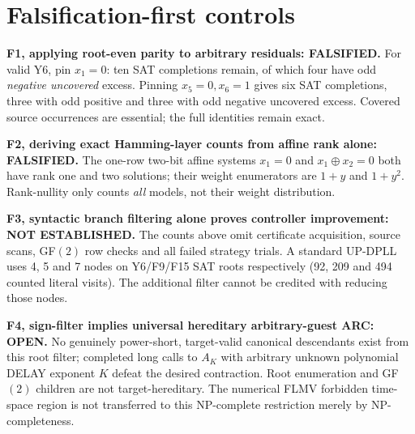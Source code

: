 \documentclass[11pt]{article}
\begin{document}
\section{Falsification-first controls}
\noindent\textbf{F1, applying root-even parity to arbitrary residuals: FALSIFIED.}
For valid Y6, pin $x_1=0$: ten SAT completions remain, of which four have odd \emph{negative uncovered} excess. Pinning $x_5=0,x_6=1$ gives six SAT completions, three with odd positive and three with odd negative uncovered excess. Covered source occurrences are essential; the full identities remain exact.
\par\noindent\textbf{F2, deriving exact Hamming-layer counts from affine rank alone: FALSIFIED.}
The one-row two-bit affine systems $x_1=0$ and $x_1\oplus x_2=0$ both have rank one and two solutions; their weight enumerators are $1+y$ and $1+y^2$. Rank-nullity only counts \emph{all} models, not their weight distribution.
\par\noindent\textbf{F3, syntactic branch filtering alone proves controller improvement: NOT ESTABLISHED.}
The counts above omit certificate acquisition, source scans, GF$(2)$ row checks and all failed strategy trials. A standard UP-DPLL uses 4, 5 and 7 nodes on Y6/F9/F15 SAT roots respectively (92, 209 and 494 counted literal visits). The additional filter cannot be credited with reducing those nodes.
\par\noindent\textbf{F4, sign-filter implies universal hereditary arbitrary-guest ARC: OPEN.}
No genuinely power-short, target-valid canonical descendants exist from this root filter; completed long calls to $A_K$ with arbitrary unknown polynomial DELAY exponent $K$ defeat the desired contraction. Root enumeration and GF$(2)$ children are not target-hereditary. The numerical FLMV forbidden time-space region is not transferred to this NP-complete restriction merely by NP-completeness.
\end{document}
